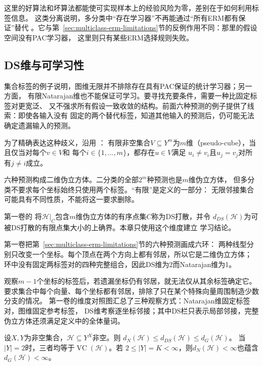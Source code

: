 这里的好算法和坏算法都能使可实现样本上的经验风险为零，差别在于如何利用标签信息。
这类分离说明，多分类中“存在学习器”不再能通过“所有ERM都有保证”替代
。它与第~\ref{sec:multiclass-erm-limitations}节的反例作用不同：那里的假设空间没有PAC学习器，
这里则只有某些ERM选择规则失败。

\subsection{DS维与可学习性}
\label{sec:ds-dimension}

集合标签的例子说明，图维无限并不排除存在具有PAC保证的统计学习器；另一方面，
有限Natarajan维也不能保证可学习。要寻找充要条件，需要一种比固定标签对更宽泛、
又不强求所有假设一致收敛的结构。前面六种预测的例子提供了线索：即使各输入没有
固定的两个替代标签，知道其他输入的预测后，仍可能无法确定遗漏输入的预测。

为了精确表达这种歧义，沿用
：
有限非空集合$V\subseteq Y^m$为$m$维（pseudo-cube），当且仅当对每个$v\in V$和
每个$i\in\{1,\ldots,m\}$，都存在$u\in V$满足
$u_i\neq v_i$且$u_j=v_j$对所有$j\neq i$成立。

六种预测构成二维伪立方体。二分类的全部$2^m$种预测也是$m$维伪立方体，
但多分类不要求每个坐标始终只使用两个标签。“有限”是定义的一部分：
无限邻接集合可能具有不同性质，不能将这一要求删除。

第一卷的
将$\mathcal H|_C$包含$m$维伪立方体的有序点集$C$称为DS打散，并令
$d_{DS}(\mathcal H)$为可被DS打散的有限点集大小的上确界。本章只使用这个维度建立
学习结论。

第一卷把第~\ref{sec:multiclass-erm-limitations}节的六种预测画成六环：
两种线型分别只改变一个坐标。每个顶点在两个方向上都有邻居，所以它是二维伪立方体；
环中没有固定两标签对的四种完整组合，因此DS维为2而Natarajan维为1。

观察$m-1$个坐标的标签后，若遗漏坐标仍有邻居，就无法仅从其余标签确定它。
要求集合中每个向量、每个坐标都有邻居，排除了只在某个特殊向量周围制造少数分支的情况。
第一卷的维度对照图汇总了三种观察方式：Natarajan维固定标签对，图维固定参考标签，
DS维考察逐坐标邻接；其中DS栏只表示局部邻接，完整伪立方体还须满足定义中的全体量词。

\begin{theorem}[多分类维度的比较]
\label{thm:learning-multiclass-dimension-comparison}
设$X,Y$为非空集合，$\mathcal H\subseteq Y^X$非空。则
$d_N(\mathcal H)\leq d_{DS}(\mathcal H)\leq d_G(\mathcal H)$。
当$|Y|=2$时，三者均等于$\operatorname{VC}(\mathcal H)$。若
$2\leq|Y|=K<\infty$，则$d_N(\mathcal H)<\infty$也蕴含
$d_G(\mathcal H)<\infty$。
\end{theorem}

